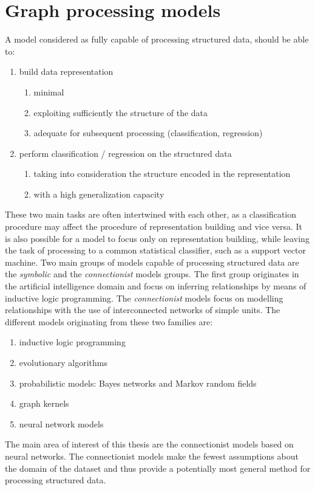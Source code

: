 
\chapter{Graph processing models}
\noindent A model considered as fully capable of processing structured data, should be able to:
\begin{enumerate}
	\item build data representation
	\begin{enumerate}
		\item minimal
		\item exploiting sufficiently the structure of the data
		\item adequate for subsequent processing (classification, regression)
	\end{enumerate}
	\item perform classification / regression on the structured data
	\begin{enumerate}
		\item taking into consideration the structure encoded in the representation
		\item with a high generalization capacity
	\end{enumerate}
\end{enumerate}
These two main tasks are often intertwined with each other, as a classification procedure may affect the procedure of representation building and vice versa. It is also possible for a model to focus only on representation building, while leaving the task of processing to a common statistical classifier, such as a support vector machine. Two main groups of models capable of processing structured data are the \emph{symbolic} and the \emph{connectionist} models groups. The first group originates in the artificial intelligence domain and focus on inferring relationships by means of inductive logic programming. The \emph{connectionist} models focus on modelling relationships with the use of interconnected networks of simple units. The different models originating from these two families are:
\begin{enumerate}
	\item inductive logic programming
	\item evolutionary algorithms
	\item probabilistic models: Bayes networks and Markov random fields
	\item graph kernels
	\item neural network models
\end{enumerate}
The main area of interest of this thesis are the connectionist models based on neural networks. The connectionist models make the fewest assumptions about the domain of the dataset and thus provide a potentially most general method for processing structured data.
